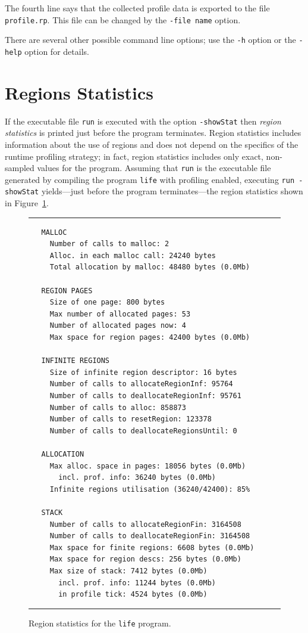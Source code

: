 \documentclass[12pt]{book}
\begin{document}
The fourth line says that the collected profile data is exported to
the file \texttt{profile.rp}. This file can be changed by the 
%
\texttt{-file name} option.

There are several other possible command line options; use the \texttt{-h} option or the 
%
\texttt{-help} option for details.

\section{Regions Statistics}
If the executable file {\tt run} is executed with the option {\tt -showStat} then
%
{\em region statistics\/} is printed just before the program
terminates. Region statistics includes information about the use of
regions and does not depend on the specifics of the runtime
profiling strategy; in fact, region statistics includes only exact,
non-sampled values for the program. Assuming that {\tt run} is the
executable file generated by compiling the program {\tt life} with
profiling enabled, executing {\tt run -showStat} yields---just before
the program terminates---the region statistics shown in
Figure~\ref{region_statistics.fig}.
\begin{figure}
\hrule \medskip
\begin{verbatim}
   MALLOC
     Number of calls to malloc: 2
     Alloc. in each malloc call: 24240 bytes
     Total allocation by malloc: 48480 bytes (0.0Mb)

   REGION PAGES
     Size of one page: 800 bytes
     Max number of allocated pages: 53
     Number of allocated pages now: 4
     Max space for region pages: 42400 bytes (0.0Mb)

   INFINITE REGIONS
     Size of infinite region descriptor: 16 bytes
     Number of calls to allocateRegionInf: 95764
     Number of calls to deallocateRegionInf: 95761
     Number of calls to alloc: 858873
     Number of calls to resetRegion: 123378
     Number of calls to deallocateRegionsUntil: 0

   ALLOCATION
     Max alloc. space in pages: 18056 bytes (0.0Mb)
       incl. prof. info: 36240 bytes (0.0Mb)
     Infinite regions utilisation (36240/42400): 85%

   STACK
     Number of calls to allocateRegionFin: 3164508
     Number of calls to deallocateRegionFin: 3164508
     Max space for finite regions: 6608 bytes (0.0Mb)
     Max space for region descs: 256 bytes (0.0Mb)
     Max size of stack: 7412 bytes (0.0Mb)
       incl. prof. info: 11244 bytes (0.0Mb)
       in profile tick: 4524 bytes (0.0Mb)
\end{verbatim}
\caption{Region statistics for the {\tt life} program.}
\label{region_statistics.fig}
\medskip\hrule
\end{figure}
\end{document}
